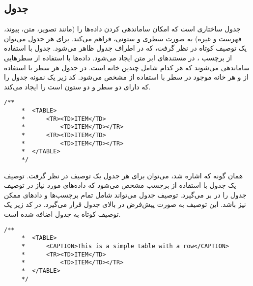 \subsection{جدول}
جدول ساختاری است که امکان ساماندهی کردن داده‌ها را (مانند تصویر، متن، پیوند، فهرست و غیره)
به صورت سطری و ستونی، فراهم می‌کند. برای هر جدول می‌توان یک توصیف کوتاه در نظر گرفت، که 
در اطراف جدول ظاهر می‌شود. جدول با استفاده از برچسب ، در مستندهای ابر متن ایجاد
می‌شود. داده‌ها با استفاده از سطرهایی ساماندهی می‌شوند که هر کدام شامل چندین خانه است. در جدول هر سطر 
با استفاده از  و هر خانه موجود در سطر با استفاده از  مشخص می‌شود. کد زیر یک نمونه
جدول را که دارای دو سطر و دو ستون است را ایجاد می‌کند.
\begin{latin}
\lstset{language=C++}  
\begin{lstlisting}[frame=single] 
    /**
     *	<TABLE>
     * 		<TR><TD>ITEM</TD>
     * 			<TD>ITEM</TD></TR>
     * 		<TR><TD>ITEM</TD>
     * 			<TD>ITEM</TD></TR>
     * 	</TABLE>
     */
\end{lstlisting}
\end{latin}
همان گونه که اشاره شد، می‌توان برای هر جدول یک توصیف در نظر گرفت. توصیف یک جدول با استفاده از
 برچسب  مشخص می‌شود که داده‌های مورد نیاز در توصیف جدول را در بر می‌گیرد.
 توصیف جدول می‌تواند شامل تمام برچسب‌ها و دادهای ممکن نیز باشد. این توصیف به صورت پیش‌فرض
 در بالای جدول قرار می‌گیرد. در کد زیر یک توصیف کوتاه به جدول اضافه شده است.
\begin{latin}
\lstset{language=C++}  
\begin{lstlisting}[frame=single] 
    /**
     *	<TABLE>
     * 		<CAPTION>This is a simple table with a row</CAPTION>
     * 		<TR><TD>ITEM</TD>
     * 			<TD>ITEM</TD></TR>
     * 	</TABLE>
     */
\end{lstlisting}
\end{latin}

